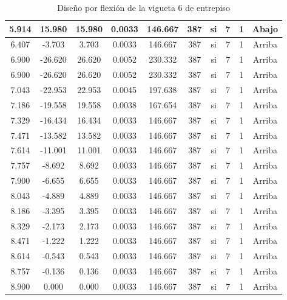 \begin{table}[H]
{\begin{tabular}{|c|c|c|c|c|c|c|c|c|c|}
    \hline
    5.914 & 15.980 & 15.980 & 0.0033 & 146.667 & 387 & si  & 7   & 1   & Abajo \bigstrut\\
    \hline
    6.407 & -3.703 & 3.703 & 0.0033 & 146.667 & 387 & si  & 7   & 1   & Arriba \bigstrut\\
    \hline
    6.900 & -26.620 & 26.620 & 0.0052 & 230.332 & 387 & si  & 7   & 1   & Arriba \bigstrut\\
    \hline
    6.900 & -26.620 & 26.620 & 0.0052 & 230.332 & 387 & si  & 7   & 1   & Arriba \bigstrut\\
    \hline
    7.043 & -22.953 & 22.953 & 0.0045 & 197.638 & 387 & si  & 7   & 1   & Arriba \bigstrut\\
    \hline
    7.186 & -19.558 & 19.558 & 0.0038 & 167.654 & 387 & si  & 7   & 1   & Arriba \bigstrut\\
    \hline
    7.329 & -16.434 & 16.434 & 0.0033 & 146.667 & 387 & si  & 7   & 1   & Arriba \bigstrut\\
    \hline
    7.471 & -13.582 & 13.582 & 0.0033 & 146.667 & 387 & si  & 7   & 1   & Arriba \bigstrut\\
    \hline
    7.614 & -11.001 & 11.001 & 0.0033 & 146.667 & 387 & si  & 7   & 1   & Arriba \bigstrut\\
    \hline
    7.757 & -8.692 & 8.692 & 0.0033 & 146.667 & 387 & si  & 7   & 1   & Arriba \bigstrut\\
    \hline
    7.900 & -6.655 & 6.655 & 0.0033 & 146.667 & 387 & si  & 7   & 1   & Arriba \bigstrut\\
    \hline
    8.043 & -4.889 & 4.889 & 0.0033 & 146.667 & 387 & si  & 7   & 1   & Arriba \bigstrut\\
    \hline
    8.186 & -3.395 & 3.395 & 0.0033 & 146.667 & 387 & si  & 7   & 1   & Arriba \bigstrut\\
    \hline
    8.329 & -2.173 & 2.173 & 0.0033 & 146.667 & 387 & si  & 7   & 1   & Arriba \bigstrut\\
    \hline
    8.471 & -1.222 & 1.222 & 0.0033 & 146.667 & 387 & si  & 7   & 1   & Arriba \bigstrut\\
    \hline
    8.614 & -0.543 & 0.543 & 0.0033 & 146.667 & 387 & si  & 7   & 1   & Arriba \bigstrut\\
    \hline
    8.757 & -0.136 & 0.136 & 0.0033 & 146.667 & 387 & si  & 7   & 1   & Arriba \bigstrut\\
    \hline
    8.900 & 0.000 & 0.000 & 0.0033 & 146.667 & 387 & si  & 7   & 1   & Arriba \bigstrut\\
    \hline
    \end{tabular}%
   
}%
      \caption{Diseño por flexión de la vigueta 6 de entrepiso}
  \label{tab:F VT6 EP}%
\end{table}%